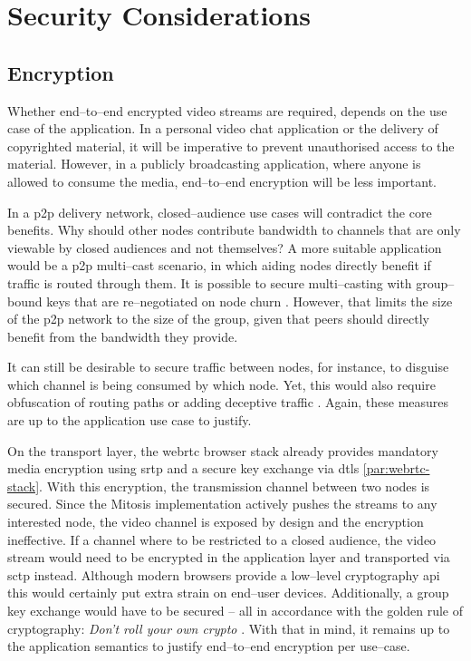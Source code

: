 \section{Security Considerations}

\subsection{Encryption}\label{sec:security-encryption}
Whether end–to–end encrypted video streams are required, depends on the use case of the application. In a personal video chat application or the delivery of copyrighted material, it will be imperative to prevent unauthorised access to the material. However, in a publicly broadcasting application, where anyone is allowed to consume the media, end–to–end encryption will be less important.

In a \gls{p2p} delivery network, closed–audience use cases will contradict the core benefits. Why should other nodes contribute bandwidth to channels that are only viewable by closed audiences and not themselves? A more suitable application would be a \gls{p2p} multi–cast scenario, in which aiding nodes directly benefit if traffic is routed through them. It is possible to secure multi–casting with group–bound keys that are re–negotiated on node churn \cite{ip-multicast-sec}. However, that limits the size of the \gls{p2p} network to the size of the group, given that peers should directly benefit from the bandwidth they provide.

It can still be desirable to secure traffic between nodes, for instance, to disguise which channel is being consumed by which node. Yet, this would also require obfuscation of routing paths \cite[\S4]{tor-privacy} or adding deceptive traffic \cite{swarm-screen}. Again, these measures are up to the application use case to justify.

On the transport layer, the \gls{webrtc} browser stack already provides mandatory media encryption using \gls{srtp} and a secure key exchange via \gls{dtls} \vref{par:webrtc-stack}. With this encryption, the transmission channel between two nodes is secured. Since the Mitosis implementation actively pushes the streams to any interested node, the video channel is exposed by design and the encryption ineffective. If a channel where to be restricted to a closed audience, the video stream would need to be encrypted in the application layer and transported via \gls{sctp} instead. Although modern browsers provide a low–level cryptography \gls{api} this would certainly put extra strain on end–user devices. Additionally, a group key exchange would have to be secured – all in accordance with the golden rule of cryptography: \textit{Don't roll your own crypto} \cite{motherboard-dont-roll-your-own-crypto, schneider-dont-roll-your-own-crypto}.
With that in mind, it remains up to the application semantics to justify end–to–end encryption per use–case.


